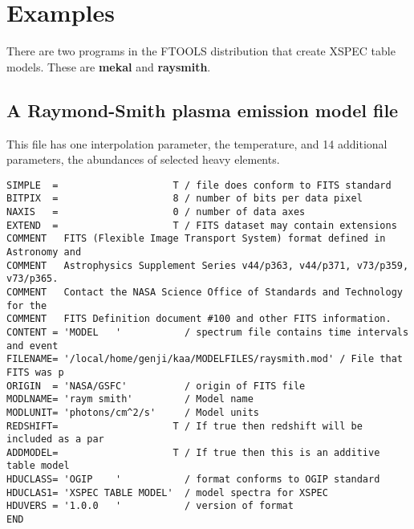 \documentclass[11pt]{article}
\begin{document}
\section{Examples}

There are two programs in the FTOOLS distribution that create XSPEC
table models. These are {\bf mekal} and {\bf raysmith}.

\subsection{A Raymond-Smith plasma emission model file}

This file has one interpolation parameter, the temperature,
and 14 additional parameters, the abundances of selected heavy 
elements.

\begin{verbatim}
SIMPLE  =                    T / file does conform to FITS standard
BITPIX  =                    8 / number of bits per data pixel
NAXIS   =                    0 / number of data axes
EXTEND  =                    T / FITS dataset may contain extensions
COMMENT   FITS (Flexible Image Transport System) format defined in Astronomy and
COMMENT   Astrophysics Supplement Series v44/p363, v44/p371, v73/p359, v73/p365.
COMMENT   Contact the NASA Science Office of Standards and Technology for the
COMMENT   FITS Definition document #100 and other FITS information.
CONTENT = 'MODEL   '           / spectrum file contains time intervals and event
FILENAME= '/local/home/genji/kaa/MODELFILES/raysmith.mod' / File that FITS was p
ORIGIN  = 'NASA/GSFC'          / origin of FITS file
MODLNAME= 'raym smith'         / Model name
MODLUNIT= 'photons/cm^2/s'     / Model units
REDSHIFT=                    T / If true then redshift will be included as a par
ADDMODEL=                    T / If true then this is an additive table model
HDUCLASS= 'OGIP    '           / format conforms to OGIP standard
HDUCLAS1= 'XSPEC TABLE MODEL'  / model spectra for XSPEC
HDUVERS = '1.0.0   '           / version of format
END
 

\end{verbatim}
\end{document}
